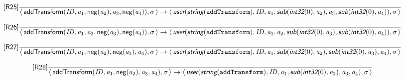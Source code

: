 \documentclass[10pt,leqno]{article}
\newcommand{\artVariable}[1]{\mbox{\em #1\/}}
\newcommand{\artConstructor}[1]{\mbox{\sf #1}}
\newcommand{\artCaseInsensitiveLiteral}[1]{\mbox{\tt #1}}
\newcommand{\artSpecial}[1]{\mbox{\sf\em #1}}
\begin{document}
\begin{equation}
\tag*{[\artConstructor{\sf R25}]}\frac{}{\langle\, \artConstructor{\sf addTransform}(\artVariable{ID}, \artVariable{a$_{1}$}, \artConstructor{\sf neg}(\artVariable{a$_{2}$}), \artVariable{a$_{3}$}, \artConstructor{\sf neg}(\artVariable{a$_{4}$})), \artVariable{$\sigma$}\,\rangle \rightarrow \langle\, \artSpecial{user}(\artSpecial{string}(\artCaseInsensitiveLiteral{addTransform}), \artVariable{ID}, \artVariable{a$_{1}$}, \artSpecial{sub}(\artSpecial{int32}(0), \artVariable{a$_{2}$}), \artVariable{a$_{3}$}, \artSpecial{sub}(\artSpecial{int32}(0), \artVariable{a$_{4}$})), \artVariable{$\sigma$}\,\rangle }
\end{equation}

\begin{equation}
\tag*{[\artConstructor{\sf R26}]}\frac{}{\langle\, \artConstructor{\sf addTransform}(\artVariable{ID}, \artVariable{a$_{1}$}, \artVariable{a$_{2}$}, \artConstructor{\sf neg}(\artVariable{a$_{3}$}), \artConstructor{\sf neg}(\artVariable{a$_{4}$})), \artVariable{$\sigma$}\,\rangle \rightarrow \langle\, \artSpecial{user}(\artSpecial{string}(\artCaseInsensitiveLiteral{addTransform}), \artVariable{ID}, \artVariable{a$_{1}$}, \artVariable{a$_{2}$}, \artSpecial{sub}(\artSpecial{int32}(0), \artVariable{a$_{3}$}), \artSpecial{sub}(\artSpecial{int32}(0), \artVariable{a$_{4}$})), \artVariable{$\sigma$}\,\rangle }
\end{equation}

\begin{equation}
\tag*{[\artConstructor{\sf R27}]}\frac{}{\langle\, \artConstructor{\sf addTransform}(\artVariable{ID}, \artVariable{a$_{1}$}, \artConstructor{\sf neg}(\artVariable{a$_{2}$}), \artConstructor{\sf neg}(\artVariable{a$_{3}$}), \artVariable{a$_{4}$}), \artVariable{$\sigma$}\,\rangle \rightarrow \langle\, \artSpecial{user}(\artSpecial{string}(\artCaseInsensitiveLiteral{addTransform}), \artVariable{ID}, \artVariable{a$_{1}$}, \artSpecial{sub}(\artSpecial{int32}(0), \artVariable{a$_{2}$}), \artSpecial{sub}(\artSpecial{int32}(0), \artVariable{a$_{3}$}), \artVariable{a$_{4}$}), \artVariable{$\sigma$}\,\rangle }
\end{equation}

\begin{equation}
\tag*{[\artConstructor{\sf R28}]}\frac{}{\langle\, \artConstructor{\sf addTransform}(\artVariable{ID}, \artVariable{a$_{1}$}, \artConstructor{\sf neg}(\artVariable{a$_{2}$}), \artVariable{a$_{3}$}, \artVariable{a$_{4}$}), \artVariable{$\sigma$}\,\rangle \rightarrow \langle\, \artSpecial{user}(\artSpecial{string}(\artCaseInsensitiveLiteral{addTransform}), \artVariable{ID}, \artVariable{a$_{1}$}, \artSpecial{sub}(\artSpecial{int32}(0), \artVariable{a$_{2}$}), \artVariable{a$_{3}$}, \artVariable{a$_{4}$}), \artVariable{$\sigma$}\,\rangle }
\end{equation}
\end{document}
